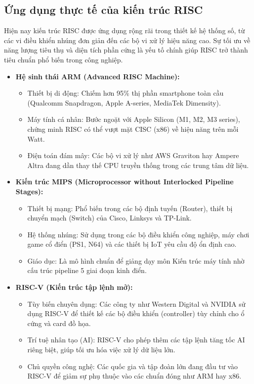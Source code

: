 \subsection{Ứng dụng thực tế của kiến trúc RISC}
Hiện nay kiến trúc RISC được ứng dụng rộng rãi trong thiết kế hệ thống số, từ các vi điều khiển nhúng đơn giản đến các bộ vi xử lý hiệu năng cao. 
Sự tối ưu về năng lượng tiêu thụ và diện tích phần cứng là yếu tố chính giúp RISC trở thành tiêu chuẩn phổ biến trong công nghiệp.
\begin{itemize}
    \item \textbf{Hệ sinh thái ARM (Advanced RISC Machine):}
    \begin{itemize}
        \item Thiết bị di động: Chiếm hơn 95\% thị phần smartphone toàn cầu (Qualcomm Snapdragon, Apple A-series, MediaTek Dimensity).
        \item Máy tính cá nhân: Bước ngoặt với Apple Silicon (M1, M2, M3 series), chứng minh RISC có thể vượt mặt CISC (x86) về hiệu năng trên mỗi Watt.
        \item Điện toán đám mây: Các bộ vi xử lý như AWS Graviton hay Ampere Altra đang dần thay thế CPU truyền thống trong các trung tâm dữ liệu.
    \end{itemize}

    \item \textbf{Kiến trúc MIPS (Microprocessor without Interlocked Pipeline Stages):}
    \begin{itemize}
        \item Thiết bị mạng: Phổ biến trong các bộ định tuyến (Router), thiết bị chuyển mạch (Switch) của Cisco, Linksys và TP-Link.
        \item Hệ thống nhúng: Sử dụng trong các bộ điều khiển công nghiệp, máy chơi game cổ điển (PS1, N64) và các thiết bị IoT yêu cầu độ ổn định cao.
        \item Giáo dục: Là mô hình chuẩn để giảng dạy môn Kiến trúc máy tính nhờ cấu trúc pipeline 5 giai đoạn kinh điển.
    \end{itemize}

    \item \textbf{RISC-V (Kiến trúc tập lệnh mở):}
    \begin{itemize}
        \item Tùy biến chuyên dụng: Các công ty như Western Digital và NVIDIA sử dụng RISC-V để thiết kế các bộ điều khiển (controller) tùy chỉnh cho ổ cứng và card đồ họa.
        \item Trí tuệ nhân tạo (AI): RISC-V cho phép thêm các tập lệnh tăng tốc AI riêng biệt, giúp tối ưu hóa việc xử lý dữ liệu lớn.
        \item Chủ quyền công nghệ: Các quốc gia và tập đoàn lớn đang đầu tư vào RISC-V để giảm sự phụ thuộc vào các chuẩn đóng như ARM hay x86.
    \end{itemize}
\end{itemize}
